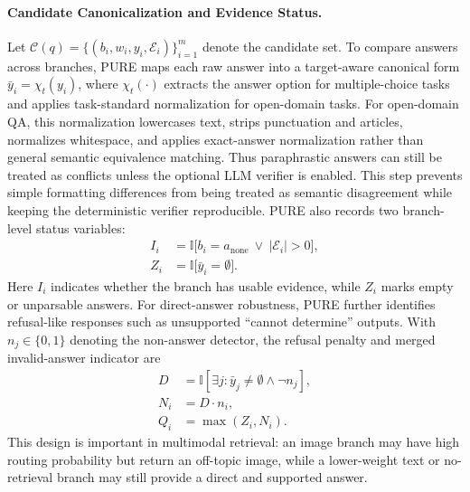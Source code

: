 \documentclass[a4paper,fleqn]{cas-dc}
\begin{document}
\paragraph{Candidate Canonicalization and Evidence Status.}
Let $\mathcal{C}(q)=\{(b_i,w_i,y_i,\mathcal{E}_i)\}_{i=1}^{m}$ denote the candidate set. To compare answers across branches, PURE maps each raw answer into a target-aware canonical form $\bar{y}_i=\chi_t(y_i)$, where $\chi_t(\cdot)$ extracts the answer option for multiple-choice tasks and applies task-standard normalization for open-domain tasks. For open-domain QA, this normalization lowercases text, strips punctuation and articles, normalizes whitespace, and applies exact-answer normalization rather than general semantic equivalence matching. Thus paraphrastic answers can still be treated as conflicts unless the optional LLM verifier is enabled. This step prevents simple formatting differences from being treated as semantic disagreement while keeping the deterministic verifier reproducible. PURE also records two branch-level status variables:
\begin{equation}
\label{eq:evidence_status}
\begin{aligned}
I_i
&=\mathbb{I}\big[b_i=a_{\mathrm{none}} \ \vee\ |\mathcal{E}_i|>0\big],\\
Z_i
&=\mathbb{I}\big[\bar{y}_i=\emptyset\big].
\end{aligned}
\end{equation}
Here $I_i$ indicates whether the branch has usable evidence, while $Z_i$ marks empty or unparsable answers. For direct-answer robustness, PURE further identifies refusal-like responses such as unsupported ``cannot determine'' outputs. With $n_j\in\{0,1\}$ denoting the non-answer detector, the refusal penalty and merged invalid-answer indicator are
\begin{equation}
\label{eq:non_answer_penalty}
\begin{aligned}
D
&=\mathbb{I}[\exists j:\bar{y}_j\ne\emptyset \wedge \neg n_j],\\
N_i
&=D\cdot n_i,\\
Q_i
&=\max(Z_i,N_i).
\end{aligned}
\end{equation}
This design is important in multimodal retrieval: an image branch may have high routing probability but return an off-topic image, while a lower-weight text or no-retrieval branch may still provide a direct and supported answer.
\end{document}
